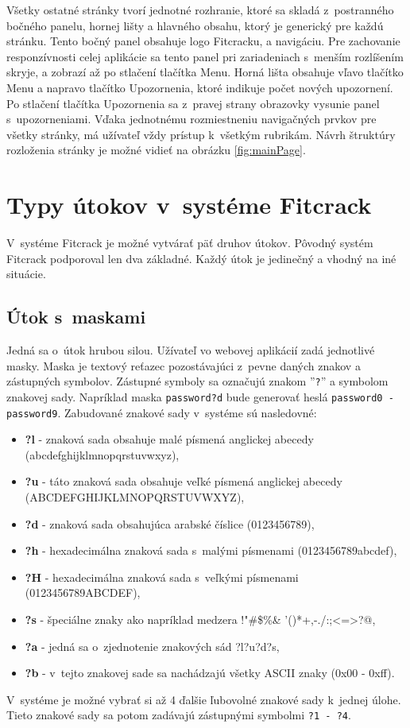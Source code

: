 \documentclass[zadani,slovak]{fitthesis}
\begin{document}
\noindent
Všetky ostatné stránky tvorí jednotné rozhranie, ktoré sa skladá z~postranného bočného panelu, hornej lišty a hlavného obsahu, ktorý je generický pre každú stránku. Tento bočný panel obsahuje logo Fitcracku, a navigáciu. Pre zachovanie responzívnosti celej aplikácie sa tento panel pri zariadeniach  s~menším rozlíšením skryje, a zobrazí až po stlačení tlačítka Menu. Horná lišta obsahuje vľavo tlačítko Menu a napravo tlačítko Upozornenia, ktoré indikuje počet nových upozornení. Po stlačení tlačítka Upozornenia sa z~pravej strany obrazovky vysunie panel s~upozorneniami. Vďaka jednotnému rozmiestneniu navigačných prvkov pre všetky stránky, má užívateľ vždy prístup k~všetkým rubrikám. Návrh štruktúry rozloženia stránky je možné vidieť na obrázku \ref{fig:mainPage}.


\section{Typy útokov v~systéme Fitcrack}
V~systéme Fitcrack je možné vytvárať päť druhov útokov. Pôvodný systém Fitcrack podporoval len dva základné. Každý útok je jedinečný a vhodný na iné situácie.


\subsection{Útok s~maskami} \label{maskAttack}
Jedná sa o~útok hrubou silou. Užívateľ  vo webovej aplikácií zadá jednotlivé masky. Maska je textový reťazec pozostávajúci z~pevne daných znakov a zástupných symbolov. Zástupné symboly sa označujú znakom ''\texttt{?}'' a symbolom znakovej sady. Napríklad maska \texttt{password?d} bude generovať heslá \texttt{password0 - password9}. Zabudované znakové sady v~systéme sú nasledovné:
\begin{itemize}
    \item \textbf{?l} - znaková sada obsahuje malé písmená anglickej abecedy (abcdefghijklmnopqrstuvwxyz),
    \item \textbf{?u} - táto znaková sada obsahuje veľké písmená anglickej abecedy (ABCDEFGHIJKLMNOPQRSTUVWXYZ),
    \item \textbf{?d} - znaková sada obsahujúca arabské číslice (0123456789),
    \item \textbf{?h} - hexadecimálna znaková sada s~malými písmenami (0123456789abcdef),
    \item \textbf{?H} - hexadecimálna znaková sada s~veľkými písmenami (0123456789ABCDEF),
    \item \textbf{?s} - špeciálne znaky ako napríklad medzera !"\#\$\%\&
    '()*+,-./:;<=>?@,
    \item \textbf{?a} - jedná sa o~zjednotenie znakových sád ?l?u?d?s,
    \item \textbf{?b} - v~tejto znakovej sade sa nachádzajú všetky ASCII znaky (0x00 - 0xff).
\end{itemize}
V~systéme je možné vybrať si až 4 ďalšie ľubovolné znakové sady k~jednej úlohe. Tieto znakové sady sa potom zadávajú zástupnými symbolmi \texttt{?1 - ?4}.
\end{document}
